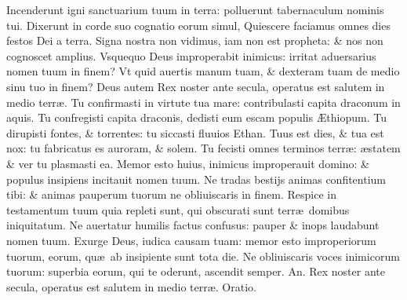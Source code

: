 \documentclass[a5paper,10pt]{book}
\def\ae{æ}
\def\AE{Æ}
\begin{document}
\begin{multicols*}{2}
\newline \color{red} I\color{black}ncenderunt igni sanctuarium tuum in terra: polluerunt tabernaculum nominis tui.
\newline \color{red} D\color{black}ixerunt in corde suo cognatio eorum simul, Quiescere faciamus omnes dies festos Dei a terra.
\newline \color{red} S\color{black}igna nostra non vidimus, iam non est propheta: \& nos non cognoscet amplius.
\newline \color{red} V\color{black}squequo Deus improperabit inimicus: irritat aduersarius nomen tuum in finem?
\newline \color{red} V\color{black}t quid auertis manum tuam, \& dexteram tuam de medio sinu tuo in finem?
\newline \color{red} D\color{black}eus autem Rex noster ante secula, operatus est salutem in medio terr\ae .
\newline \color{red} T\color{black}u confirmasti in virtute tua mare: contribulasti capita draconum in aquis.
\newline \color{red} T\color{black}u confregisti capita draconis, dedisti eum escam populis \AE thiopum.
\newline \color{red} T\color{black}u dirupisti fontes, \& torrentes: tu siccasti fluuios Ethan.
\newline \color{red} T\color{black}uus est dies, \& tua est nox: tu fabricatus es auroram, \& solem.
\newline \color{red} T\color{black}u fecisti omnes terminos terr\ae : \ae statem \& ver tu plasmasti ea.
\newline \color{red} M\color{black}emor esto huius, inimicus improperauit domino: \& populus insipiens incitauit nomen tuum.
\newline \color{red} N\color{black}e tradas bestijs animas confitentium tibi: \& animas pauperum tuorum ne obliuiscaris in finem.%
\newline \color{red} R\color{black}espice in testamentum tuum quia repleti sunt, qui obscurati sunt terr\ae \ domibus iniquitatum.
\newline \color{red} N\color{black}e auertatur humilis factus confusus: pauper \& inops laudabunt nomen tuum.
\newline \color{red} E\color{black}xurge Deus, iudica causam tuam: memor esto improperiorum tuorum, eorum, qu\ae \ ab insipiente sunt tota die.
\newline \color{red} N\color{black}e obliuiscaris voces inimicorum tuorum: superbia eorum, qui te oderunt, ascendit semper. \color{red} An. \color{black} Rex noster ante secula, operatus est salutem in medio terr\ae . \color{red} Oratio. \color{black}

\end{multicols*}
\end{document}
